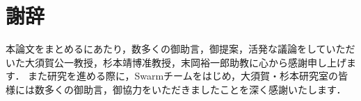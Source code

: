 \chapter*{謝辞}
本論文をまとめるにあたり，数多くの御助言，御提案，活発な議論をしていただいた大須賀公一教授，杉本靖博准教授，末岡裕一郎助教に心から感謝申し上げます．
また研究を進める際に，Swarmチームをはじめ，大須賀・杉本研究室の皆様には数多くの御助言，御協力をいただきましたことを深く感謝いたします．